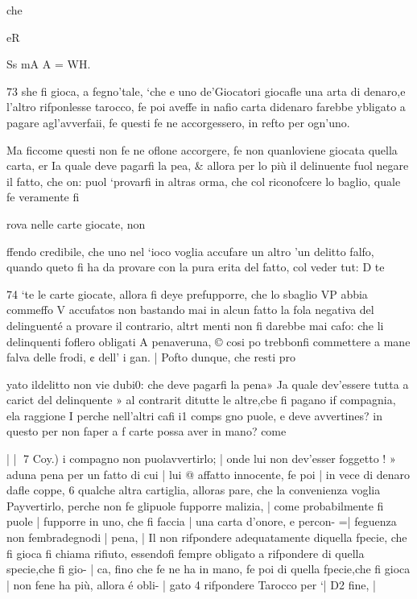 \documentclass[11pt,a6paper]{article}
\begin{document}
che

eR

Ss mA A = WH.

 
 

73
she fi gioca, a fegno'tale, ‘che
e uno de’Giocatori giocafle una
arta di denaro,e l’altro rifponlesse tarocco, fe poi aveffe in
nafio carta didenaro farebbe
ybligato a pagare agl’avverfaii, fe questi fe ne accorgessero,
in refto per ogn’uno.

Ma ficcome questi non fe ne
oflone accorgere, fe non quanloviene giocata quella carta,
er Ia quale deve pagarfi la pea, & allora per lo più il delinuente fuol negare il fatto, che
on: puol ‘provarfi in altras
orma, che col riconofcere lo
baglio, quale fe veramente fi

rova nelle carte giocate, non

ffendo credibile, che uno nel
‘ioco voglia accufare un altro
’un delitto falfo, quando queto fi ha da provare con la pura
erita del fatto, col veder tut:
D te
 

 

 

 

74
‘te le carte giocate, allora fi deye prefupporre, che lo sbaglio
VP abbia commeffo V accufatos
non bastando mai in alcun fatto
la fola negativa del delinguenté
a provare il contrario, altrt
menti non fi darebbe mai cafo:
che li delinquenti foflero obligati A penaveruna, © cosi po
trebbonfi commettere a mane
falva delle frodi, ¢ dell’ i
gan. |
Pofto dunque, che resti pro

yato ildelitto non vie dubi0:
che deve pagarfi la pena» Ja
quale dev'essere tutta a carict
del delinquente » al contrarit
ditutte le altre,cbe fi pagano if
compagnia, ela raggione I
perche nell’altri cafi i1 comps
gno puole, e deve avvertines?
in questo per non faper a f
carte possa aver in mano?
come

 

| |
7
Coy.) i
compagno non puolavvertirlo; |
onde lui non dev’esser foggetto !
» aduna pena per un fatto di cui |
lui @ affatto innocente, fe poi |
in vece di denaro dafle coppe, 6
qualche altra cartiglia, alloras
pare, che la convenienza voglia Payvertirlo, perche non
fe glipuole fupporre malizia, |
come probabilmente fi puole |
fupporre in uno, che fi faccia |
una carta d’onore, e percon- =|
feguenza non fembradegnodi |
pena, |
Il non rifpondere adequatamente diquella fpecie, che fi
gioca fi chiama rifiuto, essendofi fempre obligato a rifpondere di quella specie,che fi gio- |
ca, fino che fe ne ha in mano, fe
poi di quella fpecie,che fi gioca |
non fene ha più, allora é obli- |
gato 4 rifpondere Tarocco per ‘|
D2 fine, |
\end{document}
